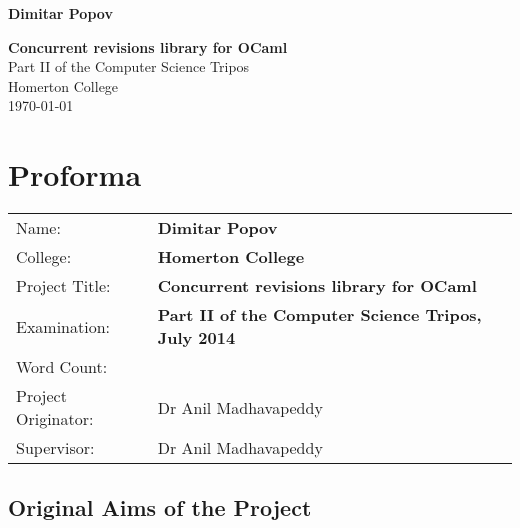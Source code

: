 \documentclass[12pt,twoside,notitlepage]{report}
\begin{document}





\pagestyle{empty}

\hfill{\LARGE \bf Dimitar Popov}

\vspace*{60mm}
\begin{center}
\Huge
{\bf Concurrent revisions library for OCaml} \\
\vspace*{5mm}
Part II of the Computer
Science Tripos\\
\vspace*{5mm}
Homerton College \\
\vspace*{5mm}
\today  %
\end{center}

\cleardoublepage


\setcounter{page}{1}
\pagestyle{plain}

\chapter*{Proforma}

{\large
\begin{tabular}{ll}
Name:               & \bf Dimitar Popov                     \\
College:            & \bf Homerton College                     \\
Project Title:      & \bf Concurrent revisions library for OCaml \\
Examination:        & \bf Part II of the Computer
Science Tripos, July 2014        \\
Word Count:         & %
\\
Project Originator: & Dr Anil Madhavapeddy                    \\
Supervisor:         & Dr Anil Madhavapeddy                    \\ 
\end{tabular}
}


\section*{Original Aims of the Project}
\end{document}
